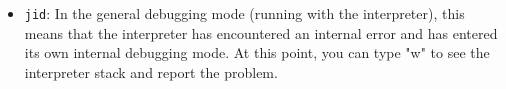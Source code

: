 \begin{itemize}
\begin{itemize}
\item {\tt jid}:
        In the general debugging mode (running with the interpreter),
        this means that the interpreter has encountered an internal 
        error and has entered its own internal debugging mode.  At this 
        point, you can type "w" to see the interpreter stack and report
        the problem.
\end{itemize}
\end{itemize}

